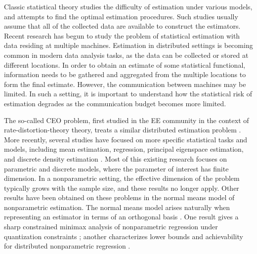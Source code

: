 \statbackground{}
Classic statistical theory studies the difficulty of estimation under
various models, and attempts to find the optimal estimation
procedures.  Such studies usually assume that all of the collected
data are available to construct the estimators.  Recent research
has begun to study the problem of statistical estimation with data
residing at
multiple machines.  Estimation in distributed settings is becoming
common in modern data analysis tasks, as the data can be collected or
stored at different locations.  In order to obtain an estimate of some
statistical functional, information needs to be gathered and
aggregated from the multiple locations to form the final
estimate. However, the communication between machines may be
limited. In such a setting, it is important to understand how the
statistical risk of estimation degrades as the communication budget
becomes more limited.

The so-called CEO problem, first studied in the EE 
community in the context of rate-distortion-theory theory, treats a
similar distributed estimation problem \citep{berger1996ceo,
  viswanathan1997quadratic}.  More recently, several studies have
focused on more specific statistical tasks and models, including mean
estimation, regression, principal eigenspace estimation, and discrete
density estimation \citep{zhang2013information, shamir2014fundamental,
  battey2015distributed, braverman2016communication,
  diakonikolas2017communication, fan2017distributed,
  lee2017communication, shang2017computational}. Most of this existing
research focuses on parametric and discrete models, where the
parameter of interest has finite dimension.  In a nonparametric
setting, the effective dimension of the problem typically grows with
the sample size, and these results no longer apply.
Other results have been obtained on these problems in the normal means
model of
nonparametric estimation.  The normal means model 
arises naturally when representing an estimator in terms of an
orthogonal
basis \citep{johnstone2002function,tsybakov:2008}.  One
result gives a sharp constrained minimax analysis of nonparametric
regression under quantization constraints \citep{Zhu:18}; another
characterizes lower bounds and achievability for distributed
nonparametric regression \citep{Zhu:18b}.


